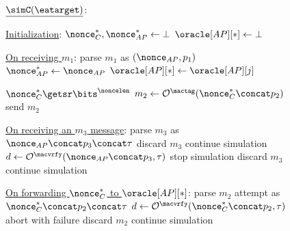 \begin{figure}

\small

\begin{adjustbox}{margin*=2ex,width=0.997\textwidth,frame,center}
	\begin{minipage}[t]{0.53\textwidth}
			$\underline{\simC(\eatarget)}$: 
			\begin{algorithmic}[1]
				\setcounter{ALG@line}{99}
				\State \underline{Initialization}:
				\Indent
					\State $\nonce_{C}^*, \nonce_{AP}^* \gets \bot$
					\State $\oracle[AP][*] \gets \bot$
				\EndIndent
				
				\Statex
				
				\setcounter{ALG@line}{199} 
				\State \underline{On receiving $m_1$}:\label{code:simC:line:m_1_start}
				\Indent
					\State parse $m_1$ as $(\nonce_{AP}, p_1)$
					\State $\nonce_{AP}^* \gets \nonce_{AP}$
						\State $\oracle[AP][*] \gets \oracle[AP][j]$
					\EndIf
					
					\State $\nonce_{C}^* \getsr \bits^\noncelen$
					\State $m_2 \gets \mathcal{O}^{\mactag}(\nonce_{C}^* \concat p_2)$
					\State send $m_2$ \label{code:simC:line:m_1_end}

				\EndIndent
		
				\Statex
				
				\setcounter{ALG@line}{299} 
				\State \underline{On receiving an $m_3$ message}: \label{code:simC:line:m_3_start}
				\Indent
					\State parse $m_3$ as $\nonce_{AP} \concat p_3 \concat \tau$
						\State discard $m_3$
						\State continue simulation
					\Else
						\State $d \gets \mathcal{O}^{\macvrfy}(\nonce_{AP} \concat p_3, \tau)$ \label{code:simC:line:verify_m_3}
							\State stop simulation \label{code:simC:line:verify_m_3:win}
						\Else
							\State discard $m_3$
							\State continue simulation \label{code:simC:line:m_3_end}
						\EndIf
					\EndIf
				\EndIndent
	
				\Statex
				
				\setcounter{ALG@line}{399} 
				\State \underline{On forwarding $\nonce_{C}^*$ to $\oracle[AP][*]$}:  \label{code:simC:line:forward_C_nonce_start}
				\Indent
					\State parse $m_2$ attempt as $\nonce_C^* \concat p_2 \concat \tau$
					\State $d \gets \mathcal{O}^{\macvrfy}(\nonce_{C}^* \concat p_2, \tau)$ \label{code:simC:line:nonce_forwarding:embed_MAC_oracle}
						\State abort with failure \label{code:simC:line:nonce_forwarding:stop_simulation}
					\Else
						\State discard $m_2$
						\State continue simulation \label{code:simC:line:forward_C_nonce_end}
					\EndIf
				\EndIndent	
	

\end{algorithmic}
\end{minipage}
\end{adjustbox}
\end{figure}
